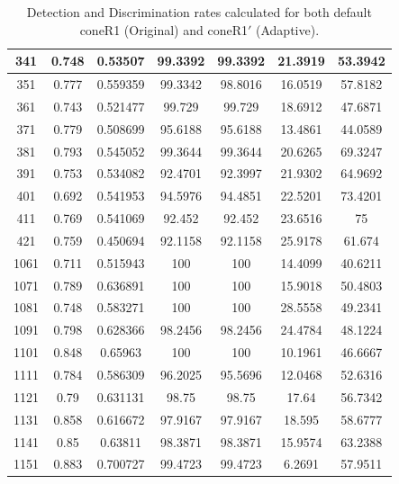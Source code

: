 \begin{appendices}
\begin{table}
\begin{tabular}{ |c|c|c|c|c|c|c| }
\hline
341 &  0.748 &  0.53507 &  99.3392 &  99.3392 &  21.3919 &  53.3942 \\
\hline
351 &  0.777 &  0.559359 &  99.3342 &  98.8016 &  16.0519 &  57.8182 \\
\hline
361 &  0.743 &  0.521477 &  99.729 &  99.729 &  18.6912 &  47.6871 \\
\hline
371 &  0.779 &  0.508699 &  95.6188 &  95.6188 &  13.4861 &  44.0589 \\
\hline
381 &  0.793 &  0.545052 &  99.3644 &  99.3644 &  20.6265 &  69.3247 \\
\hline
391 &  0.753 &  0.534082 &  92.4701 &  92.3997 &  21.9302 &  64.9692 \\
\hline
401 &  0.692 &  0.541953 &  94.5976 &  94.4851 &  22.5201 &  73.4201 \\
\hline
411 &  0.769 &  0.541069 &  92.452 &  92.452 &  23.6516 &  75 \\
\hline
421 &  0.759 &  0.450694 &  92.1158 &  92.1158 &  25.9178 &  61.674 \\
\hline
1061 &  0.711 &  0.515943 &  100 &  100 &  14.4099 &  40.6211 \\
\hline
1071 &  0.789 &  0.636891 &  100 &  100 &  15.9018 &  50.4803 \\
\hline
1081 &  0.748 &  0.583271 &  100 &  100 &  28.5558 &  49.2341 \\
\hline
1091 &  0.798 &  0.628366 &  98.2456 &  98.2456 &  24.4784 &  48.1224 \\
\hline
1101 &  0.848 &  0.65963 &  100 &  100 &  10.1961 &  46.6667 \\
\hline
1111 &  0.784 &  0.586309 &  96.2025 &  95.5696 &  12.0468 &  52.6316 \\
\hline
1121 &  0.79 &  0.631131 &  98.75 &  98.75 &  17.64 &  56.7342 \\
\hline
1131 &  0.858 &  0.616672 &  97.9167 &  97.9167 &  18.595 &  58.6777 \\
\hline
1141 &  0.85 &  0.63811 &  98.3871 &  98.3871 &  15.9574 &  63.2388 \\
\hline
1151 &  0.883 &  0.700727 &  99.4723 &  99.4723 &  6.2691 &  57.9511 \\
\hline
\end{tabular}
\caption*{Detection and Discrimination rates calculated for both default coneR1 (Original) and coneR1$'$ (Adaptive).}
\end{table}


\end{appendices}
